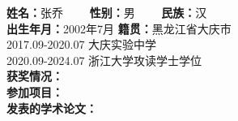 \cleardoublepage
{}
\textbf{姓名：}张乔  \ \ \ \ \textbf{性别：}男    \ \ \ \   \textbf{民族：}汉\\
\textbf{出生年月：}2002年7月  \textbf{籍贯：}黑龙江省大庆市\\
2017.09-2020.07   大庆实验中学 \\
2020.09-2024.07   浙江大学攻读学士学位\\
\textbf{获奖情况：}\\
\textbf{参加项目：}\\
\textbf{发表的学术论文：}\\
